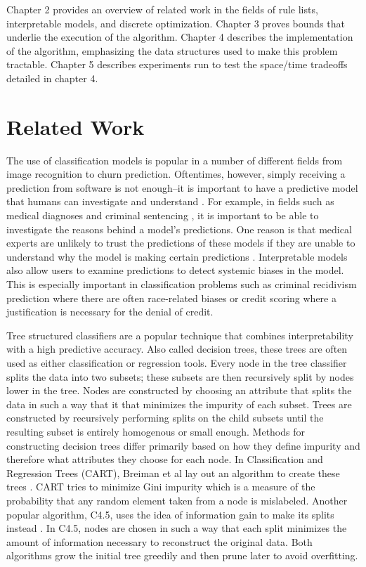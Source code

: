\documentclass[]{article}
\begin{document}
Chapter 2 provides an overview of related work in the fields of rule lists, interpretable models, and discrete optimization. 
Chapter 3 proves bounds that underlie the execution of the algorithm.
Chapter 4 describes the implementation of the algorithm, emphasizing the data structures used to make this problem tractable.
Chapter 5 describes experiments run to test the space/time tradeoffs detailed in chapter 4.

\section{Related Work}

The use of classification models is popular in a number of different fields from image recognition to churn prediction. Oftentimes, however, simply receiving a prediction from software is not enough--it is important to have a predictive model that humans can investigate and understand \cite{Ruping06, Bratko97, Quinlan99, Martens11, Freitas14}. For example, in fields such as medical diagnoses \cite{BellazziZu08} and criminal sentencing \cite{LarsonMaKiAn16}, it is important to be able to investigate the reasons behind a model's predictions. One reason is that medical experts are unlikely to trust the predictions of these models if they are unable to understand why the model is making certain predictions \cite{Lavrač99}. Interpretable models also allow users to examine predictions to detect systemic biases in the model. This is especially important in classification problems such as criminal recidivism prediction where there are often race-related biases\cite{LarsonMaKiAn16} or credit scoring where a justification is necessary for the denial of credit\cite{BaesensMuDeVaSe05}.

Tree structured classifiers are a popular technique that combines interpretability with a high predictive accuracy. Also called decision trees, these trees are often used as either classification or regression tools. Every node in the tree classifier splits the data into two subsets; these subsets are then recursively split by nodes lower in the tree. Nodes are constructed by choosing an attribute that splits the data in such a way that it that minimizes the impurity of each subset. Trees are constructed by recursively performing splits on the child subsets until the resulting subset is entirely homogenous or small enough. Methods for constructing decision trees differ primarily based on how they define impurity and therefore what attributes they choose for each node. In Classification and Regression Trees (CART), Breiman et al lay out an algorithm to create these trees \cite{BreimanFrOlSt84}. CART tries to minimize Gini impurity which is a measure of the probability that any random element taken from a node is mislabeled. Another popular algorithm, C4.5, uses the idea of information gain to make its splits instead \cite{Quinlan93}. In C4.5, nodes are chosen in such a way that each split minimizes the amount of information necessary to reconstruct the original data. Both algorithms grow the initial tree greedily and then prune later to avoid overfitting.
\end{document}
